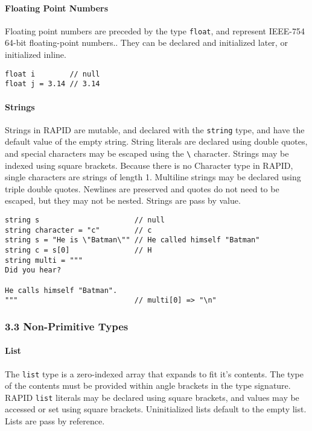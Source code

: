 \paragraph{Floating Point Numbers}\label{floating-point-numbers}

Floating point numbers are preceded by the type \texttt{float}, and
represent IEEE-754 64-bit floating-point numbers.. They can be declared
and initialized later, or initialized inline.

\begin{verbatim}
float i        // null
float j = 3.14 // 3.14
\end{verbatim}

\paragraph{Strings}\label{strings}

Strings in RAPID are mutable, and declared with the \texttt{string}
type, and have the default value of the empty string. String literals
are declared using double quotes, and special characters may be escaped
using the \texttt{\textbackslash{}} character. Strings may be indexed
using square brackets. Because there is no Character type in RAPID,
single characters are strings of length 1. Multiline strings may be
declared using triple double quotes. Newlines are preserved and quotes
do not need to be escaped, but they may not be nested. Strings are pass
by value.

\begin{verbatim}
string s                      // null
string character = "c"        // c
string s = "He is \"Batman\"" // He called himself "Batman"
string c = s[0]               // H
string multi = """
Did you hear?

He calls himself "Batman".
"""                           // multi[0] => "\n"
\end{verbatim}

\subsubsection{3.3 Non-Primitive Types}\label{non-primitive-types}

\paragraph{List}\label{list}

The \texttt{list} type is a zero-indexed array that expands to fit it's
contents. The type of the contents must be provided within angle
brackets in the type signature. RAPID \texttt{list} literals may be
declared using square brackets, and values may be accessed or set using
square brackets. Uninitialized lists default to the empty list. Lists
are pass by reference.

